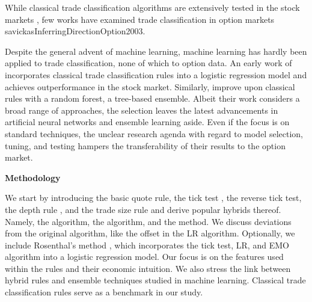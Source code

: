 While classical trade classification algorithms are extensively tested in the stock markets \autocites[e.~g.,][]{chakrabartyTradeClassificationAlgorithms2012}{finucaneDirectTestMethods2000}, few works have examined trade classification in option markets \autocite{grauerOptionTradeClassification2022}{savickasInferringDirectionOption2003}.

Despite the general advent of machine learning, machine learning has hardly been applied to trade classification, none of which to option data. An early work of \textcite{rosenthalModelingTradeDirection2012} incorporates classical trade classification rules into a logistic regression model and achieves outperformance in the stock market. Similarly, \textcites{fedeniaMachineLearningCorporate2021}{ronenMachineLearningTrade2022} improve upon classical rules with a random forest, a tree-based ensemble. Albeit their work considers a broad range of approaches, the selection leaves the latest advancements in artificial neural networks and ensemble learning aside. Even if the focus is on standard techniques, the unclear research agenda with regard to model selection, tuning, and testing hampers the transferability of their results to the option market. 

\textbf{Methodology}

We start by introducing the basic quote rule, the tick test \autocite{hasbrouckTradesQuotesInventories1988}, the reverse tick test, the depth rule \autocite{grauerOptionTradeClassification2022}, and the trade size rule \autocite{grauerOptionTradeClassification2022} and derive popular hybrids thereof. Namely, the \autocite[LR,][]{leeInferringTradeDirection1991} algorithm, the \autocite[EMO,][]{ellisAccuracyTradeClassification2000} algorithm, and the  \autocite[CLVN,][]{chakrabartyTradeClassificationAlgorithms2007} method. We discuss deviations from the original algorithm, like the offset in the LR algorithm. Optionally, we include Rosenthal's method \autocite{rosenthalModelingTradeDirection2012}, which incorporates the tick test, LR, and EMO algorithm into a logistic regression model. Our focus is on the features used within the rules and their economic intuition. We also stress the link between hybrid rules and ensemble techniques studied in machine learning. Classical trade classification rules serve as a benchmark in our study.

